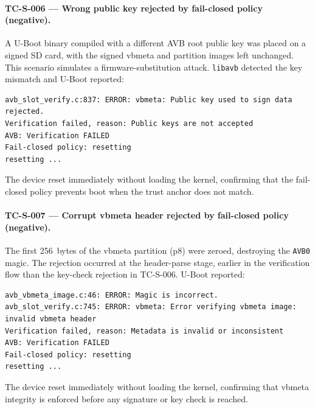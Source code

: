 \paragraph{TC-S-006 --- Wrong public key rejected by fail-closed policy (negative).}
A U-Boot binary compiled with a different AVB root public key was placed on a signed SD card, with the signed vbmeta and partition images left unchanged.  This scenario simulates a firmware-substitution attack.  \texttt{libavb} detected the key mismatch and U-Boot reported:

\begin{lstlisting}[caption={TC-S-006: U-Boot wrong-key rejection}]
avb_slot_verify.c:837: ERROR: vbmeta: Public key used to sign data rejected.
Verification failed, reason: Public keys are not accepted
AVB: Verification FAILED
Fail-closed policy: resetting
resetting ...
\end{lstlisting}

The device reset immediately without loading the kernel, confirming that the fail-closed policy prevents boot when the trust anchor does not match.

\paragraph{TC-S-007 --- Corrupt vbmeta header rejected by fail-closed policy (negative).}
The first 256~bytes of the vbmeta partition (p8) were zeroed, destroying the \texttt{AVB0} magic.  The rejection occurred at the header-parse stage, earlier in the verification flow than the key-check rejection in TC-S-006.  U-Boot reported:

\begin{lstlisting}[caption={TC-S-007: U-Boot vbmeta header rejection}]
avb_vbmeta_image.c:46: ERROR: Magic is incorrect.
avb_slot_verify.c:745: ERROR: vbmeta: Error verifying vbmeta image: invalid vbmeta header
Verification failed, reason: Metadata is invalid or inconsistent
AVB: Verification FAILED
Fail-closed policy: resetting
resetting ...
\end{lstlisting}

The device reset immediately without loading the kernel, confirming that vbmeta integrity is enforced before any signature or key check is reached.

